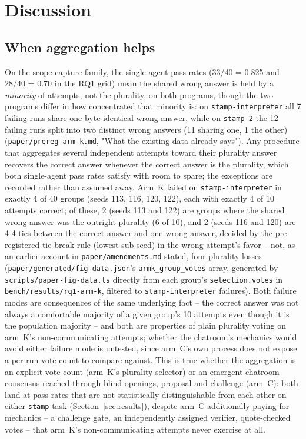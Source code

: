 \section{Discussion}
\label{sec:discussion}

\subsection{When aggregation helps}
\label{sec:discussion-helps}

On the scope-capture family, the single-agent pass rates (33/40 = 0.825 and 28/40 = 0.70 in the RQ1
grid) mean the shared wrong answer is held by a \emph{minority} of attempts, not the plurality, on both
programs, though the two programs differ in how concentrated that minority is: on
\texttt{stamp-interpreter} all 7 failing runs share one byte-identical wrong answer, while on
\texttt{stamp-2} the 12 failing runs split into two distinct wrong answers (11 sharing one, 1 the other)
(\texttt{paper/prereg-arm-k.md}, "What the existing data already says"). Any procedure that aggregates
several independent attempts toward their plurality answer recovers the correct answer whenever the
correct answer is the plurality, which both single-agent pass rates satisfy with room to spare; the
exceptions are recorded rather than assumed away. Arm~K failed on \texttt{stamp-interpreter} in exactly
4 of 40 groups (seeds 113, 116, 120, 122), each with exactly 4 of 10 attempts correct; of these, 2
(seeds 113 and 122) are groups where the shared wrong answer was the outright plurality (6 of 10), and 2
(seeds 116 and 120) are 4-4 ties between the correct answer and one wrong answer, decided by the
pre-registered tie-break rule (lowest sub-seed) in the wrong attempt's favor -- not, as an earlier
account in \texttt{paper/amendments.md} stated, four plurality losses (\texttt{paper/generated/fig-data.json}'s
\texttt{armk\_group\_votes} array, generated by \texttt{scripts/paper-fig-data.ts} directly from each
group's \texttt{selection.votes} in \texttt{bench/results/rq1-arm-k}, filtered to
\texttt{stamp-interpreter} failures). Both failure modes
are consequences of the same underlying fact -- the correct answer was not always a comfortable majority
of a given group's 10 attempts even though it is the population majority -- and both are properties of
plain plurality voting on arm~K's non-communicating attempts; whether the chatroom's mechanics would
avoid either failure mode is untested, since arm~C's own process does not expose a per-run vote count
to compare against. This is true whether the aggregation is
an explicit vote count (arm~K's plurality selector) or an emergent chatroom consensus reached through
blind openings, proposal and challenge (arm~C): both land at pass rates that are not statistically
distinguishable from each other on either \texttt{stamp} task (Section~\ref{sec:results}), despite
arm~C additionally paying for mechanics -- a challenge gate, an independently assigned verifier,
quote-checked votes -- that arm~K's non-communicating attempts never exercise at all.

